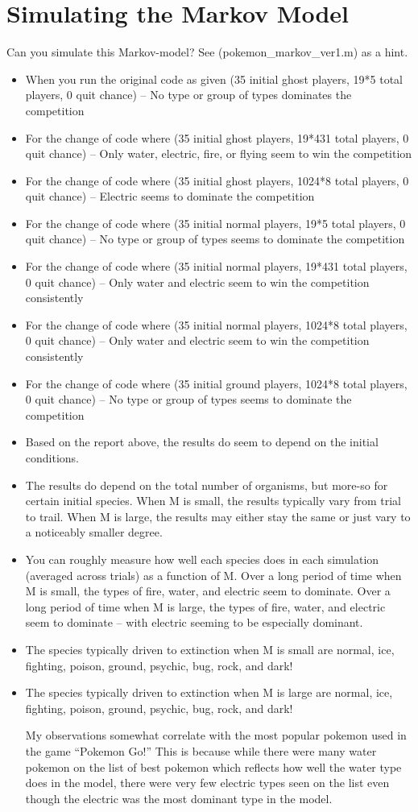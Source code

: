 \documentclass[border=1pt]{article}
\begin{document}
\section{Simulating the Markov Model}
Can you simulate this Markov-model? See (pokemon\_markov\_ver1.m) as a hint.
\begin{itemize}
\item When you run the original code as given (35 initial ghost players, 19*5 total players, 0 quit chance) – No type or group of types dominates the competition
\item For the change of code where (35 initial ghost players, 19*431 total players, 0 quit chance) – Only water, electric, fire, or flying seem to win the competition
\item For the change of code where (35 initial ghost players, 1024*8 total players, 0 quit chance) – Electric seems to dominate the competition
\item For the change of code where (35 initial normal players, 19*5 total players, 0 quit chance) – No type or group of types seems to dominate the competition
\item For the change of code where (35 initial normal players, 19*431 total players, 0 quit chance) – Only water and electric seem to win the competition consistently
\item For the change of code where (35 initial normal players, 1024*8 total players, 0 quit chance) – Only water and electric seem to win the competition consistently
\item For the change of code where (35 initial ground players, 1024*8 total players, 0 quit chance) – No type or group of types seems to dominate the competition
\item Based on the report above, the results do seem to depend on the initial conditions.
\item The results do depend on the total number of organisms, but more-so for certain initial species. When M is small, the results typically vary from trial to trail. When M is large, the results may either stay the same or just vary to a noticeably smaller degree.
\item You can roughly measure how well each species does in each simulation (averaged across trials) as a function of M. Over a long period of time when M is small, the types of fire, water, and electric seem to dominate. Over a long period of time when M is large, the types of fire, water, and electric seem to dominate – with electric seeming to be especially dominant.
\item The species typically driven to extinction when M is small are normal, ice, fighting, poison, ground, psychic, bug, rock, and dark!
\item The species typically driven to extinction when M is large are normal, ice, fighting, poison, ground, psychic, bug, rock, and dark!

My observations somewhat correlate with the most popular pokemon used in the game “Pokemon Go!” This is because while there were many water pokemon on the list of best pokemon which reflects how well the water type does in the model, there were very few electric types seen on the list even though the electric was the most dominant type in the model.
\end{itemize}
\end{document}
